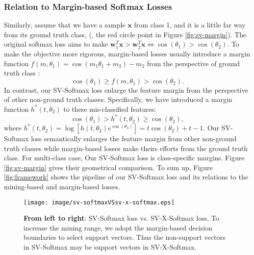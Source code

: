 \documentclass[10pt,twocolumn,letterpaper]{article}
\begin{document}
\subsubsection{Relation to Margin-based Softmax Losses}
Similarly, assume that we have a sample $\bm{x}$ from class 1, and it is a little far way from its ground truth class, (, the red circle point in Figure \ref{fig:sv-margin}). The original softmax loss aims to make $\bm{w}_1^T\bm{x}>\bm{w}_2^T\bm{x} \Longleftrightarrow \cos(\theta_1) > \cos(\theta_2)$. To make the objective more rigorous, margin-based losses usually introduce a margin function $f(m,\theta_1)=\cos(m_1\theta_1+m_3)-m_2$ from the perspective of ground truth class \cite{SphereFace,AM-Softmax,Arc-Softmax}:
\begin{equation}
 \cos(\theta_1)\geq f(m,\theta_1)>\cos(\theta_2).
\end{equation}
In contrast, our SV-Softmax loss enlarge the feature margin from the perspective of other non-ground truth classes. Specifically, we have introduced a margin function $h^*(t,\theta_2)$ to these mis-classified features:
\begin{equation}
\cos(\theta_1)>h^*(t,\theta_2)\geq \cos(\theta_2),
\end{equation}
where $h^*(t,\theta_2)=\log[h(t,\theta_2)e^{\cos(\theta_2)}]=t\cos(\theta_2)+t-1$. Our SV-Softmax loss semantically enlarges the feature margin from other non-ground truth classes while margin-based losses make theirs efforts from the ground truth class. For multi-class case, Our SV-Softmax loss is class-specific margins. Figure \ref{fig:sv-margin} gives their geometrical comparison. To sum up, Figure \ref{fig:framework} shows the pipeline of our SV-Softmax loss and its relations to the mining-based and margin-based losses.

\begin{figure}[t]
\begin{center}
\texttt{[image: image/sv-softmaxVSsv-x-softmax.eps]}
\end{center}
   \caption{\textbf{From left to right}: SV-Softmax loss vs. SV-X-Softmax loss. To increase the mining range, we adopt the margin-based decision boundaries to select support vectors. Thus the non-support vectors in SV-Softmax may be support vectors in SV-X-Softmax.}
\label{fig:sv-svx}
\end{figure}
\end{document}

